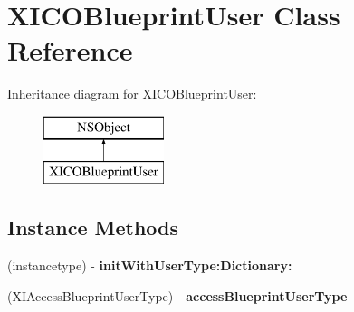 \hypertarget{interface_x_i_c_o_blueprint_user}{}\section{X\+I\+C\+O\+Blueprint\+User Class Reference}
\label{interface_x_i_c_o_blueprint_user}
Inheritance diagram for X\+I\+C\+O\+Blueprint\+User\+:\begin{figure}[H]
\begin{center}
\leavevmode
\includegraphics[height=2.000000cm]{interface_x_i_c_o_blueprint_user}
\end{center}
\end{figure}
\subsection*{Instance Methods}
\begin{DoxyCompactItemize}
\item 
\hypertarget{interface_x_i_c_o_blueprint_user_a9f27cb5aeb1d86502020f6e5aa31cea9}{}\label{interface_x_i_c_o_blueprint_user_a9f27cb5aeb1d86502020f6e5aa31cea9} 
(instancetype) -\/ {\bfseries init\+With\+User\+Type\+:\+Dictionary\+:}
\item 
\hypertarget{interface_x_i_c_o_blueprint_user_a9fcea87daaa48abef885caffce5268b4}{}\label{interface_x_i_c_o_blueprint_user_a9fcea87daaa48abef885caffce5268b4} 
(X\+I\+Access\+Blueprint\+User\+Type) -\/ {\bfseries access\+Blueprint\+User\+Type}
\end{DoxyCompactItemize}
